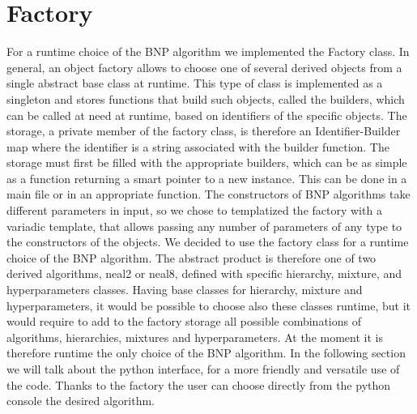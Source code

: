 \chapter{Factory}

For a runtime choice of the BNP algorithm we implemented the Factory class. In general,  an object factory allows to choose one of several derived objects from a single abstract base class at runtime. This type of class is implemented as a singleton and stores functions that build such objects, called the builders, which can be called at need at runtime, based on identifiers of the specific objects.
The storage, a private member of the factory class, is therefore an Identifier-Builder map where the identifier is a string associated with the builder function.
 The storage must first be filled with the appropriate builders, which can be as simple as a function returning a smart pointer to a new instance. This can be done in a main file or in an appropriate function.
The constructors of BNP algorithms take different parameters in input, so we chose to templatized the factory with a variadic template, that allows passing any number of parameters of any type to the constructors of the objects. 
We decided to use the factory class for a runtime choice of the BNP algorithm. The abstract product is therefore one of two derived algorithms, neal2 or neal8, defined with specific hierarchy, mixture, and hyperparameters classes. Having base classes for hierarchy, mixture and hyperparameters, it would be possible to choose also these classes runtime, but it would require to add to the factory storage all possible combinations of algorithms, hierarchies, mixtures and hyperparameters.
At the moment it is therefore runtime the only choice of the BNP algorithm.
In the following section we will talk about the python interface, for a more friendly and versatile use of the code. Thanks to the factory the user can choose directly from the python console the desired algorithm.
